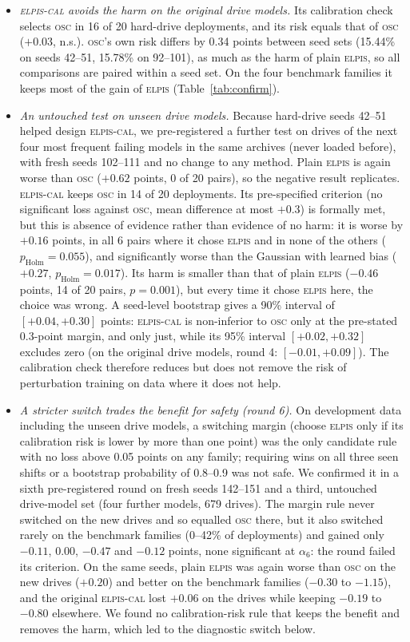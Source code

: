 \documentclass{esannV2}
\newcommand{\OSC}{\textsc{osc}}
\newcommand{\RPT}{\textsc{elpis}}
\newcommand{\AUTO}{\textsc{elpis-cal}}
\begin{document}
{\sloppy\begin{itemize}
\item \emph{\AUTO{} avoids the harm on the original drive models.} Its calibration check selects \OSC{} in 16 of 20 hard-drive deployments, and its risk equals that of \OSC{} ($+0.03$, n.s.). \OSC's own risk differs by 0.34 points between seed sets (15.44\% on seeds 42--51, 15.78\% on 92--101), as much as the harm of plain \RPT, so all comparisons are paired within a seed set. On the four benchmark families it keeps most of the gain of \RPT{} (Table~\ref{tab:confirm}).
\item \emph{An untouched test on unseen drive models.} Because hard-drive seeds 42--51 helped design \AUTO, we pre-registered a further test on drives of the next four most frequent failing models in the same archives (never loaded before), with fresh seeds 102--111 and no change to any method. Plain \RPT{} is again worse than \OSC{} ($+0.62$ points, 0 of 20 pairs), so the negative result replicates. \AUTO{} keeps \OSC{} in 14 of 20 deployments. Its pre-specified criterion (no significant loss against \OSC, mean difference at most $+0.3$) is formally met, but this is absence of evidence rather than evidence of no harm: it is worse by $+0.16$ points, in all 6 pairs where it chose \RPT{} and in none of the others ($p_{\text{Holm}}=0.055$), and significantly worse than the Gaussian with learned bias ($+0.27$, $p_{\text{Holm}}=0.017$). Its harm is smaller than that of plain \RPT{} ($-0.46$ points, 14 of 20 pairs, $p=0.001$), but every time it chose \RPT{} here, the choice was wrong. A seed-level bootstrap gives a 90\% interval of $[+0.04,+0.30]$ points: \AUTO{} is non-inferior to \OSC{} only at the pre-stated 0.3-point margin, and only just, while its 95\% interval $[+0.02,+0.32]$ excludes zero (on the original drive models, round 4: $[-0.01,+0.09]$). The calibration check therefore reduces but does not remove the risk of perturbation training on data where it does not help.
\item \emph{A stricter switch trades the benefit for safety (round 6).} On development data including the unseen drive models, a switching margin (choose \RPT{} only if its calibration risk is lower by more than one point) was the only candidate rule with no loss above 0.05 points on any family; requiring wins on all three seen shifts or a bootstrap probability of 0.8--0.9 was not safe. We confirmed it in a sixth pre-registered round on fresh seeds 142--151 and a third, untouched drive-model set (four further models, 679 drives). The margin rule never switched on the new drives and so equalled \OSC{} there, but it also switched rarely on the benchmark families (0--42\% of deployments) and gained only $-0.11$, $0.00$, $-0.47$ and $-0.12$ points, none significant at $\alpha_6$: the round failed its criterion. On the same seeds, plain \RPT{} was again worse than \OSC{} on the new drives ($+0.20$) and better on the benchmark families ($-0.30$ to $-1.15$), and the original \AUTO{} lost $+0.06$ on the drives while keeping $-0.19$ to $-0.80$ elsewhere. We found no calibration-risk rule that keeps the benefit and removes the harm, which led to the diagnostic switch below.
\end{itemize}}
\end{document}
